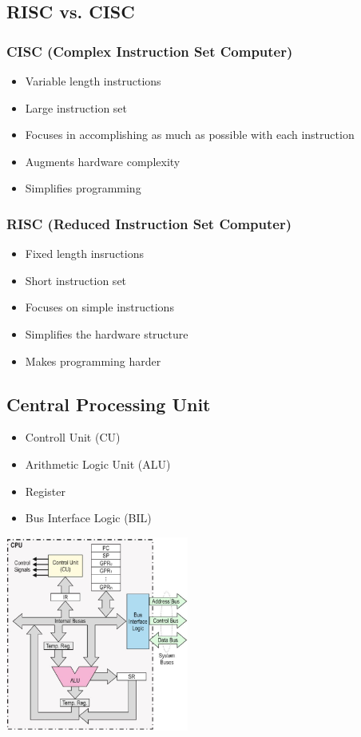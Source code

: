 \subsection{RISC vs. CISC}
\begin{multicols}{2}
	\subsubsection{CISC (Complex Instruction Set Computer)}
		\begin{itemize}
			\item Variable length instructions
			\item Large instruction set
			\item Focuses in accomplishing as much as possible with each instruction
			\item Augments hardware complexity
			\item Simplifies programming
		\end{itemize}    
	\subsubsection{RISC (Reduced Instruction Set Computer)}
		\begin{itemize}
			\item Fixed length insructions
			\item Short instruction set
			\item Focuses on simple instructions
			\item Simplifies the hardware structure
			\item Makes programming harder
		\end{itemize}      
\end{multicols}

\begin{minipage}{8cm}
	\subsection{Central Processing Unit}
	\begin{itemize}
		\item Controll Unit (CU)
		\item Arithmetic Logic Unit (ALU)
		\item Register
		\item Bus Interface Logic (BIL)
	\end{itemize}
\end{minipage}
\begin{minipage}{6cm}
	\includegraphics[width=6cm]{images/CPUComponents}
\end{minipage}

